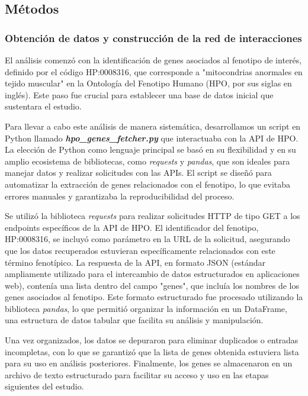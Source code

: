 \subsection{\textbf{Métodos}}

\subsubsection{\textbf{Obtención de datos y construcción de la red de interacciones}}

El análisis comenzó con la identificación de genes asociados al fenotipo de interés, definido por el código HP:0008316, que corresponde a "mitocondrias anormales en tejido muscular" en la Ontología del Fenotipo Humano (HPO, por sus siglas en inglés). Este paso fue crucial para establecer una base de datos inicial que sustentara el estudio.

Para llevar a cabo este análisis de manera sistemática, desarrollamos un script en Python llamado \textbf{\textit{hpo\_genes\_fetcher.py}} que interactuaba con la API de HPO. La elección de Python como lenguaje principal se basó en su flexibilidad y en su amplio ecosistema de bibliotecas, como \textit{requests} y \textit{pandas}, que son ideales para manejar datos y realizar solicitudes con las APIs. El script se diseñó para automatizar la extracción de genes relacionados con el fenotipo, lo que evitaba errores manuales y garantizaba la reproducibilidad del proceso.

Se utilizó la biblioteca \textit{requests} para realizar solicitudes HTTP de tipo GET a los endpoints específicos de la API de HPO. El identificador del fenotipo, HP:0008316, se incluyó como parámetro en la URL de la solicitud, asegurando que los datos recuperados estuvieran específicamente relacionados con este término fenotípico. La respuesta de la API, en formato JSON (estándar ampliamente utilizado para el intercambio de datos estructurados en aplicaciones web), contenía una lista dentro del campo "genes", que incluía los nombres de los genes asociados al fenotipo. Este formato estructurado fue procesado utilizando la biblioteca \textit{pandas}, lo que permitió organizar la información en un DataFrame, una estructura de datos tabular que facilita su análisis y manipulación.

Una vez organizados, los datos se depuraron para eliminar duplicados o entradas incompletas, con lo que se garantizó que la lista de genes obtenida estuviera lista para su uso en análisis posteriores. Finalmente, los genes se almacenaron en un archivo de texto estructurado para facilitar su acceso y uso en las etapas siguientes del estudio.

